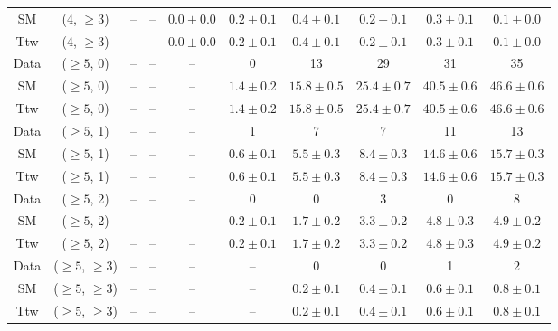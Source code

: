 \begin{table}[h!]
{\begin{tabular}{cccccccccc}
	SM & (4, $\ge3$) & -- & -- & $0.0\pm 0.0$ & $0.2\pm 0.1$ & $0.4\pm 0.1$ & $0.2\pm 0.1$ & $0.3\pm 0.1$ & $0.1\pm 0.0$ \\[0.5ex] 
	Ttw & (4, $\ge3$) & -- & -- & $0.0\pm 0.0$ & $0.2\pm 0.1$ & $0.4\pm 0.1$ & $0.2\pm 0.1$ & $0.3\pm 0.1$ & $0.1\pm 0.0$ \\[0.5ex] 
	Data & ($\ge5$, 0) & -- & -- & -- & 0 & 13 & 29 & 31 & 35 \\[0.5ex] 
	SM & ($\ge5$, 0) & -- & -- & -- & $1.4\pm 0.2$ & $15.8\pm 0.5$ & $25.4\pm 0.7$ & $40.5\pm 0.6$ & $46.6\pm 0.6$ \\[0.5ex] 
	Ttw & ($\ge5$, 0) & -- & -- & -- & $1.4\pm 0.2$ & $15.8\pm 0.5$ & $25.4\pm 0.7$ & $40.5\pm 0.6$ & $46.6\pm 0.6$ \\[0.5ex] 
	Data & ($\ge5$, 1) & -- & -- & -- & 1 & 7 & 7 & 11 & 13 \\[0.5ex] 
	SM & ($\ge5$, 1) & -- & -- & -- & $0.6\pm 0.1$ & $5.5\pm 0.3$ & $8.4\pm 0.3$ & $14.6\pm 0.6$ & $15.7\pm 0.3$ \\[0.5ex] 
	Ttw & ($\ge5$, 1) & -- & -- & -- & $0.6\pm 0.1$ & $5.5\pm 0.3$ & $8.4\pm 0.3$ & $14.6\pm 0.6$ & $15.7\pm 0.3$ \\[0.5ex] 
	Data & ($\ge5$, 2) & -- & -- & -- & 0 & 0 & 3 & 0 & 8 \\[0.5ex] 
	SM & ($\ge5$, 2) & -- & -- & -- & $0.2\pm 0.1$ & $1.7\pm 0.2$ & $3.3\pm 0.2$ & $4.8\pm 0.3$ & $4.9\pm 0.2$ \\[0.5ex] 
	Ttw & ($\ge5$, 2) & -- & -- & -- & $0.2\pm 0.1$ & $1.7\pm 0.2$ & $3.3\pm 0.2$ & $4.8\pm 0.3$ & $4.9\pm 0.2$ \\[0.5ex] 
	Data & ($\ge5$, $\ge3$) & -- & -- & -- & -- & 0 & 0 & 1 & 2 \\[0.5ex] 
	SM & ($\ge5$, $\ge3$) & -- & -- & -- & -- & $0.2\pm 0.1$ & $0.4\pm 0.1$ & $0.6\pm 0.1$ & $0.8\pm 0.1$ \\[0.5ex] 
	Ttw & ($\ge5$, $\ge3$) & -- & -- & -- & -- & $0.2\pm 0.1$ & $0.4\pm 0.1$ & $0.6\pm 0.1$ & $0.8\pm 0.1$ \\[0.5ex] 
	\hline
	\hline
\end{tabular}}
\end{table}
